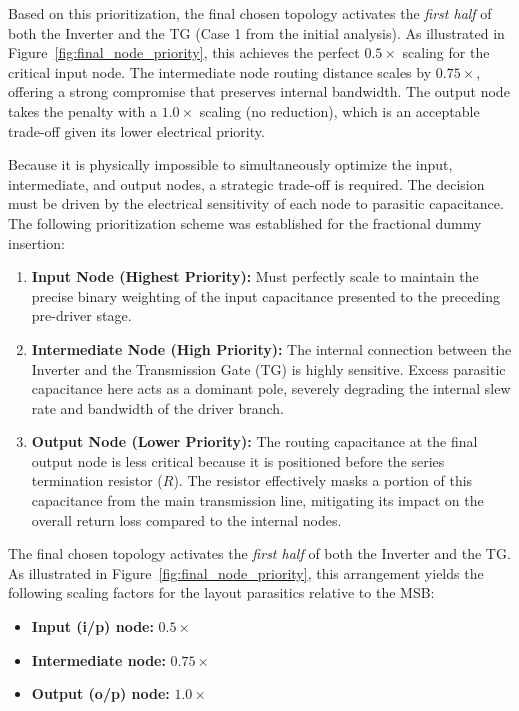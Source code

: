 Based on this prioritization, the final chosen topology activates the \textit{first half} of both the Inverter and the TG (Case 1 from the initial analysis). As illustrated in Figure~\ref{fig:final_node_priority}, this achieves the perfect $0.5\times$ scaling for the critical input node. The intermediate node routing distance scales by $0.75\times$, offering a strong compromise that preserves internal bandwidth. The output node takes the penalty with a $1.0\times$ scaling (no reduction), which is an acceptable trade-off given its lower electrical priority.

Because it is physically impossible to simultaneously optimize the input, intermediate, and output nodes, a strategic trade-off is required. The decision must be driven by the electrical sensitivity of each node to parasitic capacitance. The following prioritization scheme was established for the fractional dummy insertion:

\begin{enumerate}
    \item \textbf{Input Node (Highest Priority):} Must perfectly scale to maintain the precise binary weighting of the input capacitance presented to the preceding pre-driver stage.
    \item \textbf{Intermediate Node (High Priority):} The internal connection between the Inverter and the Transmission Gate (TG) is highly sensitive. Excess parasitic capacitance here acts as a dominant pole, severely degrading the internal slew rate and bandwidth of the driver branch.
    \item \textbf{Output Node (Lower Priority):} The routing capacitance at the final output node is less critical because it is positioned before the series termination resistor ($R$). The resistor effectively masks a portion of this capacitance from the main transmission line, mitigating its impact on the overall return loss compared to the internal nodes.
\end{enumerate}

The final chosen topology activates the \textit{first half} of both the Inverter and the TG. As illustrated in Figure~\ref{fig:final_node_priority}, this arrangement yields the following scaling factors for the layout parasitics relative to the MSB:
\begin{itemize}
    \item \textbf{Input (i/p) node:} $0.5\times$
    \item \textbf{Intermediate node:} $0.75\times$
    \item \textbf{Output (o/p) node:} $1.0\times$
\end{itemize}

